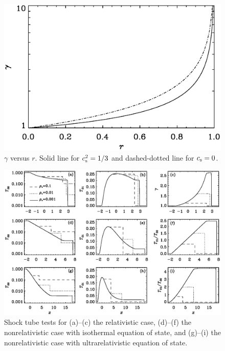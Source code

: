 \documentclass[twocolumn]{article}
\begin{document}
\begin{figure}[h!]\begin{center}
\includegraphics[width=\columnwidth]{p}
\end{center}\caption[]{
$\gamma$ versus $r$.
Solid line for $c_{\rm s}^2=1/3$ and dashed-dotted line for $c_{\rm s}=0$.
}\label{p}\end{figure}

\begin{figure}[h!]\begin{center}
\includegraphics[width=\textwidth]{pcomp_shock}
\end{center}\caption[]{
Shock tube tests for (a)--(c) the relativistic case,
(d)--(f) the nonrelativistic case with isothermal equation of state, and
(g)--(i) the nonrelativistic case with ultrarelativistic equation of state.
}\label{pcomp_shock}\end{figure}
\end{document}
